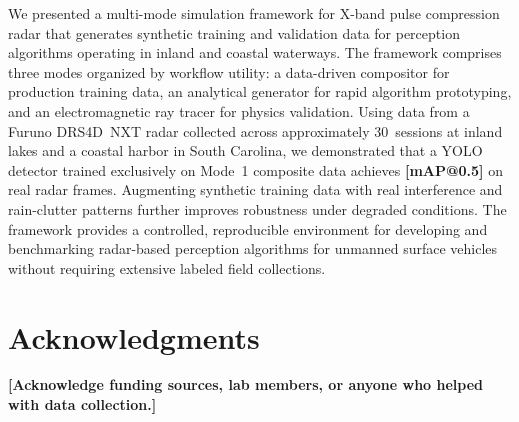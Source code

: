 \documentclass[twocolumn, 10pt]{article}
\newcommand{\ph}[1]{\textbf{[#1]}}
\begin{document}
We presented a multi-mode simulation framework for X-band pulse compression radar that generates synthetic training and validation data for perception algorithms operating in inland and coastal waterways. The framework comprises three modes organized by workflow utility: a data-driven compositor for production training data, an analytical generator for rapid algorithm prototyping, and an electromagnetic ray tracer for physics validation. Using data from a Furuno DRS4D~NXT radar collected across approximately 30~sessions at inland lakes and a coastal harbor in South Carolina, we demonstrated that a YOLO detector trained exclusively on Mode~1 composite data achieves \ph{mAP@0.5} on real radar frames. Augmenting synthetic training data with real interference and rain-clutter patterns further improves robustness under degraded conditions. The framework provides a controlled, reproducible environment for developing and benchmarking radar-based perception algorithms for unmanned surface vehicles without requiring extensive labeled field collections.

\section*{Acknowledgments}

\ph{Acknowledge funding sources, lab members, or anyone who helped with data collection.}




\end{document}
